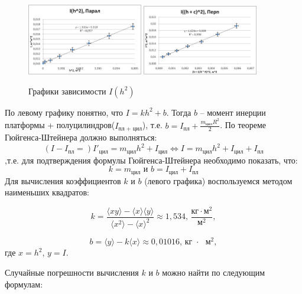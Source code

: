 \documentclass[a4paper,14pt]{extarticle}
\begin{document}
	\begin{figure}[!h]
		\begin{center}
			\includegraphics[width=0.45\textwidth]{graph_1}
			\includegraphics[width=0.45\textwidth]{graph_2}
			\caption{Графики зависимости $ I(h^2) $}
			\label{ris:grafik}
		\end{center}
	\end{figure}

	По левому графику понятно, что $I = kh^2 + b$. 
	Тогда $b$ -- момент инерции платформы + полуцилиндров($I_\text{пл + цил}$), т.е. $b = I_\text{пл} + \frac{m_\text{цил} R^2}{2}$. 
	\newpage
	По теореме Гюйгенса-Штейнера должно выполняться:
	$$(I - I_\text{пл} =) I'_\text{цил} = m_\text{цил} h^2 + I_\text{цил} \Leftrightarrow I = m_\text{цил} h^2 + I_\text{цил} + I_\text{пл} $$
,т.е. для подтверждения формулы Гюйгенса-Штейнера необходимо показать, что:
$$k = m_\text{цил} \text{ и } b = I_\text{цил} + I_\text{пл}$$
 Для вычисления коэффициентов $ k $ и $ b $ (левого графика) воспользуемся методом наименьших квадратов:
		
	\begin{equation}
		k=\frac{\langle xy\rangle-\langle x\rangle \langle y\rangle}{\langle x^2\rangle - \langle x\rangle^2}\approx 1,534\text{, } \frac{\text{кг}\cdot\text{м}^2}{\text{м}^2},
	\end{equation}
	
	\begin{equation}
		b=\langle y \rangle -k\langle x \rangle\approx 0,01016\text{,  кг $\cdot$ $\text{м}^2$},
	\end{equation}
	где $ x=h^2 $, $ y=I $.
	
	Случайные погрешности вычисления $ k $ и $ b $ можно найти по следующим формулам:
	
\end{document}
